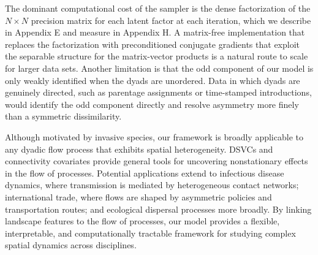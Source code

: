 \documentclass{article}
\begin{document}
The dominant computational cost of the sampler is the dense factorization of the $N \times N$ precision matrix for each latent factor at each iteration, which we describe in Appendix E and measure in Appendix H. A matrix-free implementation that replaces the factorization with preconditioned conjugate gradients that exploit the separable structure for the matrix-vector products is a natural route to scale for larger data sets. 
Another limitation is that the odd component of our model is only weakly identified when the dyads are unordered. Data in which dyads are genuinely directed, such as parentage assignments or time-stamped introductions, would identify the odd component directly and resolve asymmetry more finely than a symmetric dissimilarity.



Although motivated by invasive species, our framework is broadly applicable to any dyadic flow process that exhibits spatial heterogeneity. DSVCs and connectivity covariates provide general tools for uncovering nonstationary effects in the flow of processes. Potential applications extend to infectious disease dynamics, where transmission is mediated by heterogeneous contact networks; international trade, where flows are shaped by asymmetric policies and transportation routes; and ecological dispersal processes more broadly. By linking landscape features to the flow of processes, our model provides a flexible, interpretable, and computationally tractable framework for studying complex spatial dynamics across disciplines.  
\end{document}
